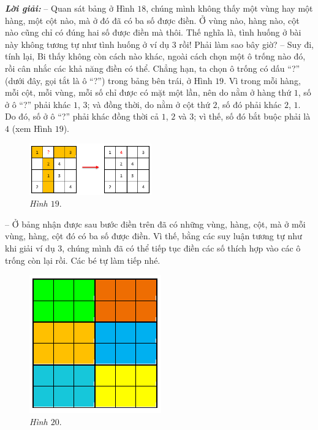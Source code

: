 	\textbf{\textit{Lời giải:}}
	\vskip 0.1cm
	-- Quan sát bảng ở Hình $18$, chúng mình không thấy một vùng hay một hàng, một cột nào, mà ở đó đã có ba số được điền. Ở vùng nào, hàng nào, cột nào cũng chỉ có đúng hai số được điền mà thôi. Thế nghĩa là, tình huống ở bài này không tương tự như tình huống ở ví dụ $3$ rồi! Phải làm sao bây giờ?
	\vskip 0.2cm
	-- Suy đi, tính lại, Bi thấy không còn cách nào khác, ngoài cách chọn một ô trống nào đó, rồi cân nhắc các khả năng điền có thể. Chẳng hạn, ta chọn ô trống có dấu “?” (dưới đây, gọi tắt là ô “?”) trong bảng bên trái, ở Hình $19$. Vì trong mỗi hàng, mỗi cột, mỗi vùng, mỗi số chỉ được có mặt một lần, nên do nằm ở hàng thứ $1$, số ở ô “?” phải khác $1$, $3$; và đồng thời, do nằm ở cột thứ $2$, số đó phải khác $2$, $1$. Do đó, số ở ô “?” phải khác đồng thời cả $1$, $2$ và $3$; vì thế, số đó bắt buộc phải là $4$ (xem Hình $19$).
	\vskip 0.1cm
		\begin{figure}
			\centering
			\vspace*{-15pt}
			\captionsetup{labelformat= empty, justification=centering}
			\includegraphics[width=0.47\textwidth]{pic8}
			\vspace*{-5pt}
			\caption{\small\textit{Hình $19.$}}
			\vspace*{-10pt}
		\end{figure}
	-- Ở bảng nhận được sau bước điền trên đã có những vùng, hàng, cột, mà ở mỗi vùng, hàng, cột đó có ba số được điền. Vì thế, bằng các suy luận tương tự như khi giải ví dụ $3$, chúng mình đã có thể tiếp tục điền các số thích hợp vào các ô trống còn lại rồi. Các bé tự làm tiếp nhé.
	\vskip 0.1cm
	\begin{figure}
		\centering
		\vspace*{-30pt}
		\captionsetup{labelformat= empty, justification=centering}
		\includegraphics[scale=0.5]{pic9}
		\vspace*{-5pt}
		\caption{\small\textit{Hình $20.$}}
		\vspace*{-25pt}
	\end{figure}
